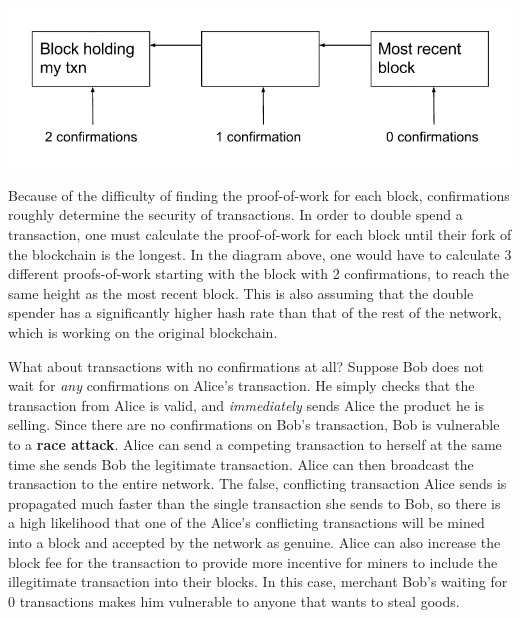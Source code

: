\documentclass[full.tex]{subfiles}
\begin{document}
  \includegraphics[scale=0.5]{confirmations}
  
  Because of the difficulty of finding the proof-of-work for each block, confirmations roughly determine the security of transactions. In order to double spend a transaction, one must calculate the proof-of-work for each block until their fork of the blockchain is the longest. In the diagram above, one would have to calculate 3 different proofs-of-work starting with the block with 2 confirmations, to reach the same height as the most recent block. This is also assuming that the double spender has a significantly higher hash rate than that of the rest of the network, which is working on the original blockchain.
  
  What about transactions with no confirmations at all? Suppose Bob does not wait for \textit{any} confirmations on Alice's transaction. He simply checks that the transaction from Alice is valid, and \textit{immediately} sends Alice the product he is selling. Since there are no confirmations on Bob's transaction, Bob is vulnerable to a \textbf{race attack}. Alice can send a competing transaction to herself at the same time she sends Bob the legitimate transaction. Alice can then broadcast the transaction to the entire network. The false, conflicting transaction Alice sends is propagated much faster than the single transaction she sends to Bob, so there is a high likelihood that one of the Alice's conflicting transactions will be mined into a block and accepted by the network as genuine. Alice can also increase the block fee for the transaction to provide more incentive for miners to include the illegitimate transaction into their blocks. In this case, merchant Bob's waiting for 0 transactions makes him vulnerable to anyone that wants to steal goods. 
  
\end{document}
